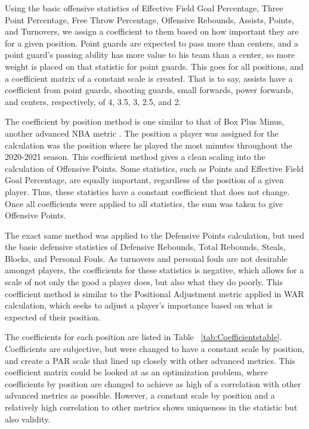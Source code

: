 \documentclass[titlepage, 12pt]{article}
\begin{document}
Using the basic offensive 
statistics of Effective Field Goal 
Percentage, Three Point Percentage, Free Throw Percentage, Offensive 
Rebounds, Assists, Points, and 
Turnovers, we assign a coefficient to them based on how important they 
are for a given position. Point 
guards are expected to pass more than centers, and a point guard's 
passing ability has more value to his 
team than a center, so more weight is placed on that statistic for point 
guards. This goes for all positions, 
and a coefficient matrix of a constant scale is created. That is to say, 
assists have a coefficient from point 
guards, shooting guards, small forwards, power forwards, and centers, 
respectively, of 4, 3.5, 3, 2.5, and 2. 

The coefficient by position method is one similar to that of Box Plus 
Minus, another advanced NBA metric \citep{BasketballReferenceBPM}. 
The position a player was assigned for the calculation was the position 
where he played the most minutes 
throughout the 2020-2021 season. This coefficient method gives a clean 
scaling into the calculation of 
Offensive Points. Some statistics, such as Points and Effective Field Goal 
Percentage, are equally 
important, regardless of the position of a given player. Thus, these 
statistics have a constant coefficient that 
does not change. Once all coefficients were applied to all statistics, the 
sum was taken to give Offensive 
Points. 

The exact same method was applied to the Defensive Points 
calculation, but used the basic 
defensive statistics of Defensive Rebounds, Total Rebounds, Steals, 
Blocks, and Personal Fouls. As 
turnovers and personal fouls are not desirable amongst players, the 
coefficients for these statistics is 
negative, which allows for a scale of not only the good a player does, but 
also what they do poorly. This 
coefficient method is similar to the Positional Adjustment metric applied in 
WAR calculation, which seeks to 
adjust a player's importance based on what is expected of their position.

 
The coefficients for each position are listed in Table~
\ref{tab:Coefficientstable}. Coefficients are subjective, but were changed 
to have a constant scale by position, and create a PAR scale that lined up 
closely with other advanced metrics. This coefficient matrix could be 
looked at as an optimization problem, where coefficients by position are 
changed to achieve as high of a correlation with other advanced metrics 
as possible. However, a constant scale by position and a relatively high 
correlation to other metrics shows uniqueness in the statistic but also 
validity.
\end{document}
